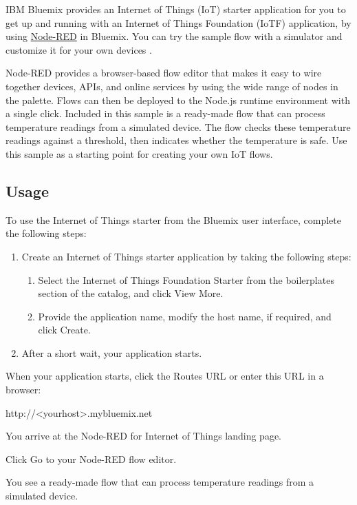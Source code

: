\documentclass[]{book}
\begin{document}
IBM Bluemix provides an Internet of Things (IoT) starter application for you to get up and running with an Internet of Things Foundation (IoTF) application, by using \hyperref[nodered]{Node-RED} in Bluemix. You can try the sample flow with a simulator and customize it for your own devices \cite{herukogithub}.

Node-RED provides a browser-based flow editor that makes it easy to wire together devices, APIs, and online services by using the wide range of nodes in the palette. Flows can then be deployed to the Node.js runtime environment with a single click. Included in this sample is a ready-made flow that can process temperature readings from a simulated device. The flow checks these temperature readings against a threshold, then indicates whether the temperature is safe. Use this sample as a starting point for creating your own IoT flows.


\subsection{Usage}

To use the Internet of Things starter from the Bluemix user interface, complete the following steps:
\begin{enumerate}


\item Create an Internet of Things starter application by taking the following steps:
\begin{enumerate}
\item Select the Internet of Things Foundation Starter from the boilerplates section of the catalog, and click View More.

\item Provide the application name, modify the host name, if required, and click Create.
\end{enumerate}
\item After a short wait, your application starts.

\end{enumerate}

When your application starts, click the Routes URL or enter this URL in a browser:
\begin{code}
http://<yourhost>.mybluemix.net
\end{code}
You arrive at the Node-RED for Internet of Things landing page.

Click Go to your Node-RED flow editor.

You see a ready-made flow that can process temperature readings from a simulated device.
\end{document}

